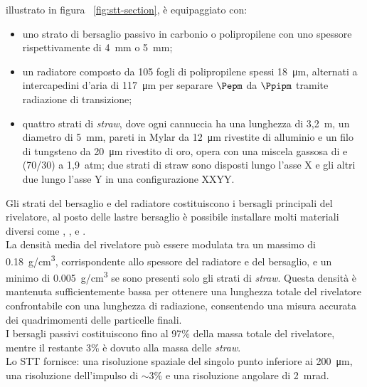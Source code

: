\documentclass[../../main.tex]{subfiles}
\begin{document}
  illustrato in figura ~\ref{fig:stt-section}, è equipaggiato con:
  \begin{itemize}
    \item uno strato di bersaglio passivo in carbonio o polipropilene con uno
    spessore rispettivamente di 4~mm o 5~mm;

    \item un radiatore composto da 105 fogli di polipropilene spessi
    \SI{18}{\micro\meter}, alternati a intercapedini d'aria di
    \SI{117}{\micro\meter} per separare $\Pepm$ da $\Ppipm$
    tramite radiazione di transizione;

    \item quattro strati di \textit{straw}, dove ogni cannuccia ha una lunghezza
    di 3,2~m, un diametro di 5~mm, pareti in Mylar da \SI{12}{\micro\meter}
    rivestite di alluminio e un filo di tungsteno da \SI{20}{\micro\meter}
    rivestito di oro, opera con una miscela gassosa di  e 
    (70/30) a 1,9~atm; due strati di straw sono disposti lungo l'asse X e gli
    altri due lungo l'asse Y in una configurazione XXYY\@.
  \end{itemize}
  Gli strati del bersaglio e del radiatore costituiscono i bersagli principali
  del rivelatore, al posto delle lastre bersaglio è possibile installare molti
  materiali diversi come , ,  e .\\
  La densità media del rivelatore può essere modulata tra un massimo di
  \SI{0,18}{g/cm^3}, corrispondente allo spessore del radiatore e del
  bersaglio, e un minimo di \SI{0,005}{g/cm^3} se sono presenti solo gli strati
  di \textit{straw}.
  Questa densità è mantenuta sufficientemente bassa per ottenere una lunghezza
  totale del rivelatore confrontabile con una lunghezza di radiazione,
  consentendo una misura accurata dei quadrimomenti delle particelle finali.\\
  I bersagli passivi costituiscono fino al 97\% della massa totale del
  rivelatore, mentre il restante 3\% è dovuto alla massa delle \textit{straw}.\\
  Lo STT fornisce: una risoluzione spaziale del singolo punto inferiore ai
  \SI{200}{\micro\meter}, una risoluzione dell'impulso di $\sim$3\% e una
  risoluzione angolare di 2~mrad.
\end{document}
